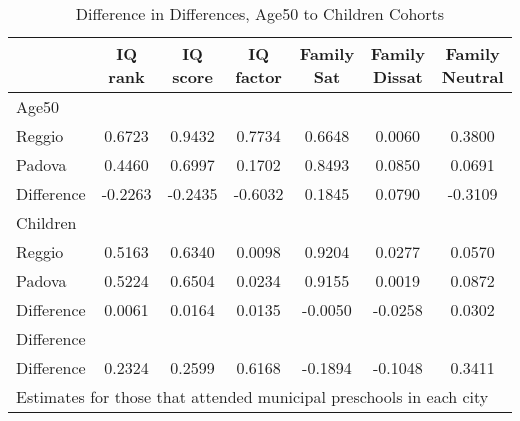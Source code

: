 \begin{table}[htbp]\centering
\caption{Difference in Differences, Age50 to Children Cohorts}
\begin{tabular}{l*{6}{c}}
\hline\hline
            &     IQ rank&    IQ score&   IQ factor&  Family Sat&Family Dissat&Family Neutral\\
\hline
Age50       &            &            &            &            &            &            \\
Reggio      &      0.6723&      0.9432&      0.7734&      0.6648&      0.0060&      0.3800\\
Padova      &      0.4460&      0.6997&      0.1702&      0.8493&      0.0850&      0.0691\\
Difference  &     -0.2263&     -0.2435&     -0.6032&      0.1845&      0.0790&     -0.3109\\
\hline
Children    &            &            &            &            &            &            \\
Reggio      &      0.5163&      0.6340&      0.0098&      0.9204&      0.0277&      0.0570\\
Padova      &      0.5224&      0.6504&      0.0234&      0.9155&      0.0019&      0.0872\\
Difference  &      0.0061&      0.0164&      0.0135&     -0.0050&     -0.0258&      0.0302\\
\hline
Difference  &            &            &            &            &            &            \\
Difference  &      0.2324&      0.2599&      0.6168&     -0.1894&     -0.1048&      0.3411\\
\hline\hline
\multicolumn{7}{l}{\footnotesize Estimates for those that attended municipal preschools in each city}\\
\end{tabular}
\end{table}
